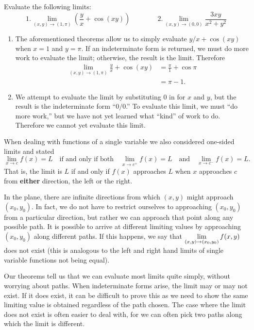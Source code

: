 \begin{example}\label{ex_multilimit3}%
Evaluate the following limits:
\[1. \lim_{(x,y)\to (1,\pi)}\left(\frac yx+\cos(xy)\right)\qquad\qquad 2. \lim_{(x,y)\to (0,0)} \frac{3xy}{x^2+y^2}\]
\solution
\begin{enumerate}
	\item The aforementioned theorems allow us to simply evaluate $y/x+\cos(xy)$ when $x=1$ and $y=\pi$. If an indeterminate form is returned, we must do more work to evaluate the limit; otherwise, the result is the limit. Therefore
	\begin{align*}
	\lim_{(x,y)\to (1,\pi)} \frac yx + \cos(xy)  &= \frac\pi{1}+\cos \pi \\
		&= \pi -1.
	\end{align*}
	\item		We attempt to evaluate the limit by substituting 0 in for $x$ and $y$, but the result is the indeterminate form ``$0/0$.'' To evaluate this limit, we must ``do more work,'' but we have not yet learned what ``kind'' of work to do. Therefore we cannot yet evaluate this limit.
\end{enumerate}
\end{example}

When dealing with functions of a single variable we also considered one-sided limits and stated
\[
\lim_{x\to c}f(x) = L
\quad\text{if and only if both}\quad
\lim_{x\to c^+}f(x) =L \quad\text{and}\quad \lim_{x\to c^-}f(x) =L.
\]
That is, the limit is $L$ if and only if $f(x)$ approaches $L$ when $x$ approaches $c$ from \textbf{either} direction, the left or the right.

In the plane, there are infinite directions from which $(x,y)$ might approach $(x_0,y_0)$. In fact, we do not have to restrict ourselves to approaching $(x_0,y_0)$ from a particular direction, but rather we can approach that point along any possible path. It is possible to arrive at different limiting values by approaching $(x_0,y_0)$ along different paths. If this happens, we say that $\displaystyle \lim_{(x,y)\to(x_0,y_0) } f(x,y)$ does not exist (this is analogous to the left and right hand limits of single variable functions not being equal).

Our theorems tell us that we can evaluate most limits quite simply, without worrying about  paths. When indeterminate forms arise, the limit may or may not exist. If it does exist, it can be difficult to prove this as we need to show the same limiting value is obtained regardless of the path chosen. The case where the limit does not exist is often easier to deal with, for we can often pick two paths along which the limit is different.

